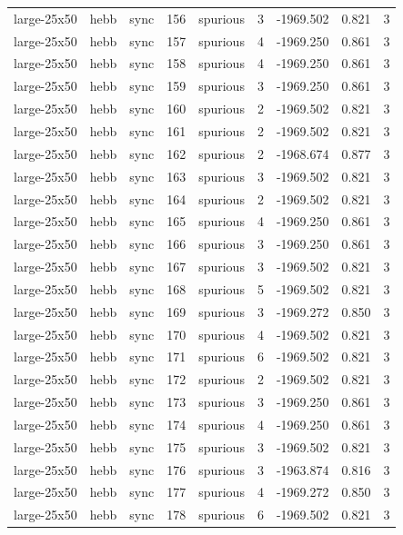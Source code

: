 \begin{tabular}{lllrlrrrr}
large-25x50 & hebb & sync & 156 & spurious & 3 & -1969.502 & 0.821 & 3 \\
large-25x50 & hebb & sync & 157 & spurious & 4 & -1969.250 & 0.861 & 3 \\
large-25x50 & hebb & sync & 158 & spurious & 4 & -1969.250 & 0.861 & 3 \\
large-25x50 & hebb & sync & 159 & spurious & 3 & -1969.250 & 0.861 & 3 \\
large-25x50 & hebb & sync & 160 & spurious & 2 & -1969.502 & 0.821 & 3 \\
large-25x50 & hebb & sync & 161 & spurious & 2 & -1969.502 & 0.821 & 3 \\
large-25x50 & hebb & sync & 162 & spurious & 2 & -1968.674 & 0.877 & 3 \\
large-25x50 & hebb & sync & 163 & spurious & 3 & -1969.502 & 0.821 & 3 \\
large-25x50 & hebb & sync & 164 & spurious & 2 & -1969.502 & 0.821 & 3 \\
large-25x50 & hebb & sync & 165 & spurious & 4 & -1969.250 & 0.861 & 3 \\
large-25x50 & hebb & sync & 166 & spurious & 3 & -1969.250 & 0.861 & 3 \\
large-25x50 & hebb & sync & 167 & spurious & 3 & -1969.502 & 0.821 & 3 \\
large-25x50 & hebb & sync & 168 & spurious & 5 & -1969.502 & 0.821 & 3 \\
large-25x50 & hebb & sync & 169 & spurious & 3 & -1969.272 & 0.850 & 3 \\
large-25x50 & hebb & sync & 170 & spurious & 4 & -1969.502 & 0.821 & 3 \\
large-25x50 & hebb & sync & 171 & spurious & 6 & -1969.502 & 0.821 & 3 \\
large-25x50 & hebb & sync & 172 & spurious & 2 & -1969.502 & 0.821 & 3 \\
large-25x50 & hebb & sync & 173 & spurious & 3 & -1969.250 & 0.861 & 3 \\
large-25x50 & hebb & sync & 174 & spurious & 4 & -1969.250 & 0.861 & 3 \\
large-25x50 & hebb & sync & 175 & spurious & 3 & -1969.502 & 0.821 & 3 \\
large-25x50 & hebb & sync & 176 & spurious & 3 & -1963.874 & 0.816 & 3 \\
large-25x50 & hebb & sync & 177 & spurious & 4 & -1969.272 & 0.850 & 3 \\
large-25x50 & hebb & sync & 178 & spurious & 6 & -1969.502 & 0.821 & 3 \\

\end{tabular}
